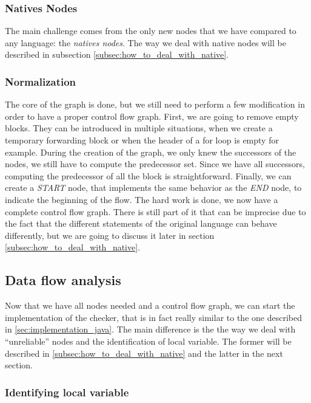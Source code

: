 \subsubsection{Natives Nodes}
\label{subsubsec:native_nodes_cfg}

The main challenge comes from the only new nodes that we have compared to any language: the \emph{natives nodes}. 
The way we deal with native nodes will be described in subsection \ref{subsec:how_to_deal_with_native}.

\subsubsection{Normalization}
\label{subsubsec:normalization_cfg}
The core of the graph is done, but we still need to perform a few modification in order to have a proper control flow graph. 
First, we are going to remove empty blocks. 
They can be introduced in multiple situations, when we create a temporary forwarding block or when the header of a for loop is empty for example.
During the creation of the graph, we only knew the successors of the nodes, we still have to compute the predecessor set. 
Since we have all successors, computing the predecessor of all the block is straightforward. Finally, we can create a \emph{START} node, that implements the same behavior as the \emph{END} node, to indicate the beginning of the flow. \newline
The hard work is done, we now have a complete control flow graph. 
There is still part of it that can be imprecise due to the fact that the different statements of the original language can behave differently, but we are going to discuss it later in section \ref{subsec:how_to_deal_with_native}.

\subsection{Data flow analysis}
\label{subsec:data_flow_analysis}

Now that we have all nodes needed and a control flow graph, we can start the implementation of the checker, that is in fact really similar to the one described in \ref{sec:implementation_java}. 
The main difference is the the way we deal with “unreliable” nodes and the identification of local variable. 
The former will be described in \ref{subsec:how_to_deal_with_native} and the latter in the next section.

\subsubsection{Identifying local variable}
\label{subsubsec:identifying_local_variable}

